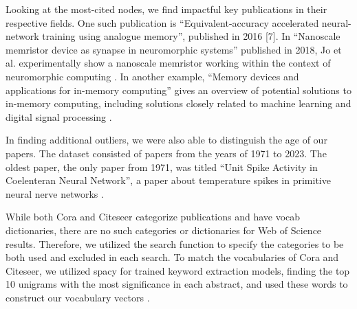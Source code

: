 \documentclass[conference]{IEEEtran}
\begin{document}
Looking at the most-cited nodes, we find impactful key publications 
in their respective fields. One such publication is “Equivalent-accuracy 
accelerated neural-network training using analogue memory”, published in 2016 [7]. 
In “Nanoscale memristor device as synapse in neuromorphic systems'' published 
in 2018,  Jo et al. experimentally show a nanoscale memristor working within 
the context of neuromorphic computing \cite{Jo}. In another example, “Memory devices 
and applications for in-memory computing” gives an overview of potential solutions 
to in-memory computing, including solutions closely related to machine learning and 
digital signal processing \cite{Sebastian}. \par

In finding additional outliers, we were also able to distinguish the age of our papers. 
The dataset consisted of papers from the years of 1971 to 2023. The oldest paper, 
the only paper from 1971, was titled “Unit Spike Activity in Coelenteran Neural Network”, 
a paper about temperature spikes in primitive neural nerve networks \cite{Rm}.  \par

While both Cora and Citeseer categorize publications and have vocab dictionaries, 
there are no such categories or dictionaries for Web of Science results. 
Therefore, we utilized the search function to specify the categories to be 
both used and excluded in each search. To match the vocabularies of Cora and 
Citeseer, we utilized spacy for trained keyword extraction models, finding 
the top 10 unigrams with the most significance in each abstract, and used 
these words to construct our vocabulary vectors \cite{keywordspacy}. \par
\end{document}
